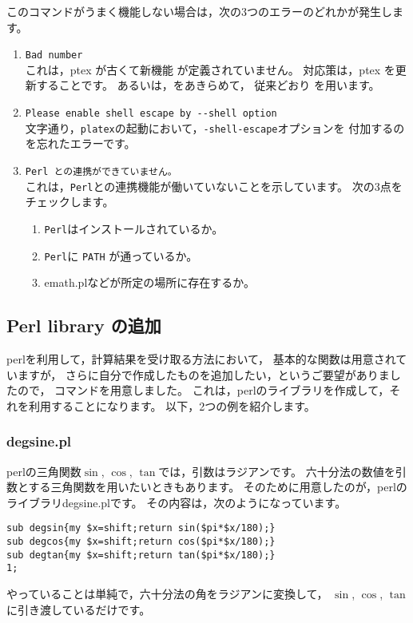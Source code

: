 このコマンドがうまく機能しない場合は，次の3つのエラーのどれかが発生します。
\begin{enumerate}[(1)]
  \item \verb+Bad number+\\
    これは，ptex が古くて新機能  が定義されていません。
    対応策は，ptex を更新することです。
    あるいは，をあきらめて，
    従来どおり を用います。
  \item \verb+Please enable shell escape by --shell option+\\
    文字通り，\texttt{platex}の起動において，\verb+-shell-escape+オプションを
    付加するのを忘れたエラーです。
  \item \verb+Perl との連携ができていません。+\\
    これは，\texttt{Perl}との連携機能が働いていないことを示しています。
    次の3点をチェックします。
    \begin{enumerate}[(\protect\expandafter\emroman i)]
      \item \texttt{Perl}はインストールされているか。
      \item \texttt{Perl}に \texttt{PATH} が通っているか。
      \item \textsf{emath.pl}などが所定の場所に存在するか。
    \end{enumerate}
    
\end{enumerate}

\subsection{Perl library の追加}
\textsf{perl}を利用して，計算結果を受け取る方法において，
基本的な関数は用意されていますが，
さらに自分で作成したものを追加したい，というご要望がありましたので，
コマンドを用意しました。
これは，\textsf{perl}のライブラリを作成して，それを利用することになります。
以下，2つの例を紹介します。

\subsubsection{\textsf{degsine.pl}}
\textsf{perl}の三角関数$\sin$, $\cos$, $\tan$では，引数はラジアンです。
六十分法の数値を引数とする三角関数を用いたいときもあります。
そのために用意したのが，\textsf{perl}のライブラリ\textsf{degsine.pl}です。
その内容は，次のようになっています。
\begin{boxnote}
\begin{verbatim}
sub degsin{my $x=shift;return sin($pi*$x/180);}
sub degcos{my $x=shift;return cos($pi*$x/180);}
sub degtan{my $x=shift;return tan($pi*$x/180);}
1;
\end{verbatim}
\end{boxnote}
やっていることは単純で，六十分法の角をラジアンに変換して，
$\sin$, $\cos$, $\tan$に引き渡しているだけです。

